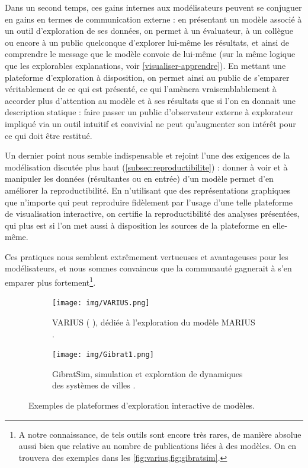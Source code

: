 \documentclass[a4paper, 12pt]{article}
\begin{document}
Dans un second temps, ces gains internes aux modélisateurs peuvent se conjuguer en gains en termes de communication externe : en présentant un modèle associé à un outil d'exploration de ses données, on permet à un évaluateur, à un collègue ou encore à un public quelconque d'explorer lui-même les résultats, et ainsi de comprendre le message que le modèle convoie de lui-même (sur la même logique que les \og explorables explanations\fg{}, voir \cref{visualiser-apprendre}).
En mettant une plateforme d'exploration à disposition, on permet ainsi au public de s'emparer véritablement de ce qui est présenté, ce qui l'amènera vraisemblablement à accorder plus d'attention au modèle et à ses résultats que si l'on en donnait une description statique : faire passer un public d'observateur externe à explorateur impliqué via un outil intuitif et convivial ne peut qu'augmenter son intérêt pour ce qui doit être restitué.

Un dernier point nous semble indispensable et rejoint l'une des exigences de la modélisation discutée plus haut (\cref{subsec:reproductibilite}) : donner à voir et à manipuler les données (résultantes ou en entrée) d'un modèle permet d'en améliorer la reproductibilité.
En n'utilisant que des représentations graphiques que n'importe qui peut reproduire fidèlement par l'usage d'une telle plateforme de visualisation interactive, on certifie la reproductibilité des analyses présentées, qui plus est si l'on met aussi à disposition les sources de la plateforme en elle-même.


Ces pratiques nous semblent extrêmement vertueuses et avantageuses pour les modélisateurs, et nous sommes convaincus que la communauté gagnerait à s'en emparer plus fortement\footnote{
A notre connaissance, de tels outils sont encore très rares, de manière absolue aussi bien que relative au nombre de publications liées à des modèles. On en trouvera des exemples dans les \cref{fig:varius,fig:gibratsim}.
}. 

\begin{figure}[H]
	\centering
	\begin{subfigure}[t]{.5\linewidth}
		\centering
		\texttt{[image: img/VARIUS.png]}
		\captionsetup{width = .95\linewidth}
		\caption{\og VARIUS\fg{} (\citeauthor{cottineau_visualizing_2015} \citeyear{cottineau_visualizing_2015}), dédiée à l'exploration du modèle MARIUS \autocite{cottineau_levolution_2014}.}
		\label{fig:varius}
	\end{subfigure}%
	\begin{subfigure}[t]{.5\linewidth}
		\centering
		\texttt{[image: img/Gibrat1.png]}
		\captionsetup{width = .95\linewidth}
		\caption{\og GibratSim\fg{}, simulation et exploration de dynamiques des systèmes de villes \autocite{cura_old_2017}.}
		\label{fig:gibratsim}
	\end{subfigure}
\caption{Exemples de plateformes d'exploration interactive de modèles.}
\end{figure}
\end{document}
